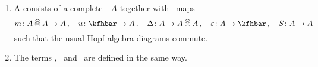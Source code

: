 \documentclass[a4paper, 11pt, oneside]{scrartcl}
\begin{document}
\begin{definition}
  \label{topological definitions}
  \leavevmode
  \begin{enumerate}
    \item
      A  consists of a complete~\module{$\kfhbar$}~$A$ together with~\linear{$\kfhbar$} maps
      \[
        m \colon A \ctensor A \to A \,,
        \quad
        u \colon \kfhbar \to A \,,
        \quad
        \Delta \colon A \to A \ctensor A \,,
        \quad
        \varepsilon \colon A \to \kfhbar \,,
        \quad
        S \colon A \to A
      \]
      such that the usual Hopf algebra diagrams commute.
    \item
      The terms ,~ and~ are defined in the same way.
  \end{enumerate}
\end{definition}
\end{document}

